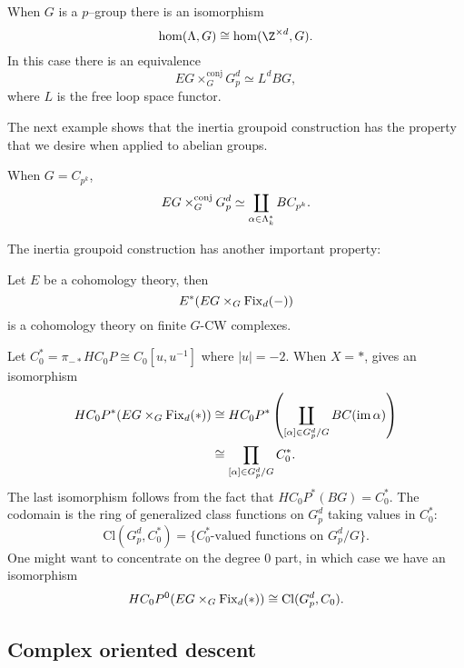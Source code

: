 \begin{example}
When $G$ is a $p$--group there is an isomorphism
\[
\hom(\Lambda,G) \cong \hom(\Z^{\times d}, G).
\]
In this case there is an equivalence
\[
EG \times_{G}^{\mathrm{conj}} G_{p}^{d} \simeq L^dBG,
\]
where $L$ is the free loop space functor. 
\end{example}

The next example shows that the inertia groupoid construction has the property that we desire when applied to abelian groups.
\begin{example} \label{zpk}
When $G = C_{p^k}$,
\[
EG \times_{G}^{\text{conj}} G_{p}^{d} \simeq \coprod_{\alpha \in \Lambda_k^*} BC_{p^k}.
\]
\end{example}

The inertia groupoid construction has another important property: 
\begin{proposition}
Let $E$ be a cohomology theory, then
\[
E^*(EG \times_G \operatorname{Fix}_d(-))
\]
is a cohomology theory on finite $G$-CW complexes.
\end{proposition}

\begin{example} \label{app:classfncs}
Let $C_{0}^{*} = \pi_{-*}HC_0P \cong C_0[u,u^{-1}]$ where $|u|=-2$. When $X = *$,  gives an isomorphism
\begin{align*}
HC_{0}P^*(EG \times_G \operatorname{Fix}_d(*)) &\cong HC_{0}P^{*}\left(\coprod_{[\alpha] \in G_{p}^{d}/G} BC(\operatorname{im} \alpha)\right) \\
&\cong \prod_{[\alpha] \in G_{p}^{d}/G}C_{0}^{*}.
\end{align*}
The last isomorphism follows from the fact that $HC_{0}P^{*}(BG) = C_{0}^{*}$. The codomain is the ring of generalized class functions on $G_{p}^{d}$ taking values in $C_{0}^{*}$:
\[
\mathrm{Cl}(G_{p}^{d}, C_{0}^{*}) = \{C_{0}^{*} \text{-valued functions on } G_{p}^{d}/G\}.
\]
One might want to concentrate on the degree $0$ part, in which case we have an isomorphism
\[
HC_{0}P^0(EG \times_G \operatorname{Fix}_d(*)) \cong \mathrm{Cl}(G_{p}^{d}, C_{0}).
\]
\end{example}


\subsection*{Complex oriented descent}

